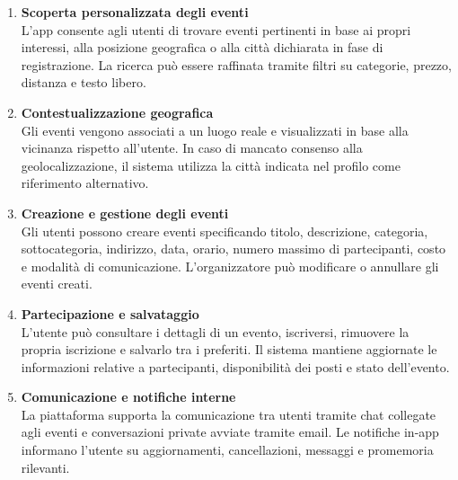 \begin{enumerate}
    \item \textbf{Scoperta personalizzata degli eventi} \\
    L’app consente agli utenti di trovare eventi pertinenti in base ai propri interessi, alla posizione geografica o alla città dichiarata in fase di registrazione. La ricerca può essere raffinata tramite filtri su categorie, prezzo, distanza e testo libero.

    \item \textbf{Contestualizzazione geografica} \\
    Gli eventi vengono associati a un luogo reale e visualizzati in base alla vicinanza rispetto all’utente. In caso di mancato consenso alla geolocalizzazione, il sistema utilizza la città indicata nel profilo come riferimento alternativo.

    \item \textbf{Creazione e gestione degli eventi} \\
    Gli utenti possono creare eventi specificando titolo, descrizione, categoria, sottocategoria, indirizzo, data, orario, numero massimo di partecipanti, costo e modalità di comunicazione. L’organizzatore può modificare o annullare gli eventi creati.

    \item \textbf{Partecipazione e salvataggio} \\
    L’utente può consultare i dettagli di un evento, iscriversi, rimuovere la propria iscrizione e salvarlo tra i preferiti. Il sistema mantiene aggiornate le informazioni relative a partecipanti, disponibilità dei posti e stato dell’evento.

    \item \textbf{Comunicazione e notifiche interne} \\
    La piattaforma supporta la comunicazione tra utenti tramite chat collegate agli eventi e conversazioni private avviate tramite email. Le notifiche in-app informano l’utente su aggiornamenti, cancellazioni, messaggi e promemoria rilevanti.
\end{enumerate}

